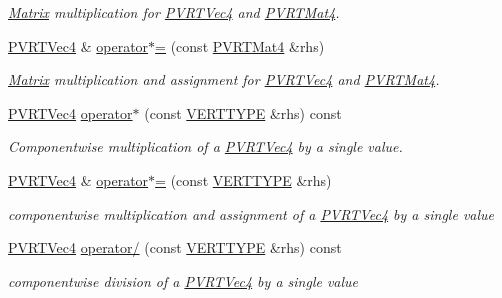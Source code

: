 \begin{DoxyCompactItemize}
\begin{DoxyCompactList}\small\item\em \hyperlink{class_matrix}{Matrix} multiplication for \hyperlink{struct_p_v_r_t_vec4}{P\+V\+R\+T\+Vec4} and \hyperlink{struct_p_v_r_t_mat4}{P\+V\+R\+T\+Mat4}. \end{DoxyCompactList}\item 
\hyperlink{struct_p_v_r_t_vec4}{P\+V\+R\+T\+Vec4} \& \hyperlink{struct_p_v_r_t_vec4_a85872941f178c6009f2ccf0bcf533bb8}{operator$\ast$=} (const \hyperlink{struct_p_v_r_t_mat4}{P\+V\+R\+T\+Mat4} \&rhs)
\begin{DoxyCompactList}\small\item\em \hyperlink{class_matrix}{Matrix} multiplication and assignment for \hyperlink{struct_p_v_r_t_vec4}{P\+V\+R\+T\+Vec4} and \hyperlink{struct_p_v_r_t_mat4}{P\+V\+R\+T\+Mat4}. \end{DoxyCompactList}\item 
\hyperlink{struct_p_v_r_t_vec4}{P\+V\+R\+T\+Vec4} \hyperlink{struct_p_v_r_t_vec4_ae2c1b60447924cab0970039b8ca68937}{operator$\ast$} (const \hyperlink{group___a_p_i___o_g_l_e_s_ga06da457b7d3e93368ab904f89e1396be}{V\+E\+R\+T\+T\+Y\+P\+E} \&rhs) const 
\begin{DoxyCompactList}\small\item\em Componentwise multiplication of a \hyperlink{struct_p_v_r_t_vec4}{P\+V\+R\+T\+Vec4} by a single value. \end{DoxyCompactList}\item 
\hyperlink{struct_p_v_r_t_vec4}{P\+V\+R\+T\+Vec4} \& \hyperlink{struct_p_v_r_t_vec4_a94b8e9cafe3d03855732a006d180e1fe}{operator$\ast$=} (const \hyperlink{group___a_p_i___o_g_l_e_s_ga06da457b7d3e93368ab904f89e1396be}{V\+E\+R\+T\+T\+Y\+P\+E} \&rhs)
\begin{DoxyCompactList}\small\item\em componentwise multiplication and assignment of a \hyperlink{struct_p_v_r_t_vec4}{P\+V\+R\+T\+Vec4} by a single value \end{DoxyCompactList}\item 
\hyperlink{struct_p_v_r_t_vec4}{P\+V\+R\+T\+Vec4} \hyperlink{struct_p_v_r_t_vec4_a71e969e8575f8499ba4a7fcc0b2c3e29}{operator/} (const \hyperlink{group___a_p_i___o_g_l_e_s_ga06da457b7d3e93368ab904f89e1396be}{V\+E\+R\+T\+T\+Y\+P\+E} \&rhs) const 
\begin{DoxyCompactList}\small\item\em componentwise division of a \hyperlink{struct_p_v_r_t_vec4}{P\+V\+R\+T\+Vec4} by a single value \end{DoxyCompactList}\item 

\end{DoxyCompactItemize}

